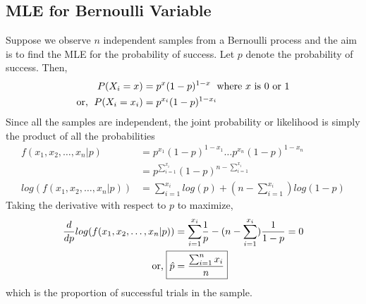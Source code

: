 \documentclass[../probability-notes.tex]{subfiles}
\begin{document}
    \subsection{MLE for Bernoulli Variable}
    Suppose we observe $n$ independent samples from a Bernoulli process and the aim is to find the MLE for the probability of success.\newline
    Let $p$ denote the probability of success. Then,
    \begin{align*}
        P(X_{i} = x) &= p^{x}(1-p)^{1-x} \text{\; where $x$ is $0$ or $1$}\\
        \text{or, \;} P(X_{i} = x_{i}) &= p^{x_{i}}(1-p)^{1-x_{i}}
    \end{align*}
    Since all the samples are independent, the joint probability or likelihood is simply the product of all the probabilities
    \begin{align*}
        f(x_{1}, x_{2}, \ldots, x_{n}|p) &= p^{x_{1}}(1-p)^{1-x_{1}} \ldots p^{x_{n}}(1-p)^{1-x_{n}}\\
        &= p^{\sum_{i=1}^{x_{i}}} (1-p)^{n-\sum_{i=1}^{x_{i}}}\\
        log(f(x_{1}, x_{2}, \ldots, x_{n}|p)) &= {\sum_{i=1}^{x_{i}}}log(p) + (n-{\sum_{i=1}^{x_{i}}})log(1-p)
    \end{align*}
    Taking the derivative with respect to $p$ to maximize,
    \begin{align*}
        \frac{d}{dp}log(f(x_{1}, x_{2}, \ldots, x_{n}|p)) &= {\sum_{i=1}^{x_{i}}}\frac{1}{p} - (n-{\sum_{i=1}^{x_{i}}})\frac{1}{1-p} = 0\\
        \text{or,\;} \Aboxed{\hat{p} &= \frac{\sum_{i=1}^{n}x_{i}}{n}}
    \end{align*}
    which is the proportion of successful trials in the sample.


\end{document}
